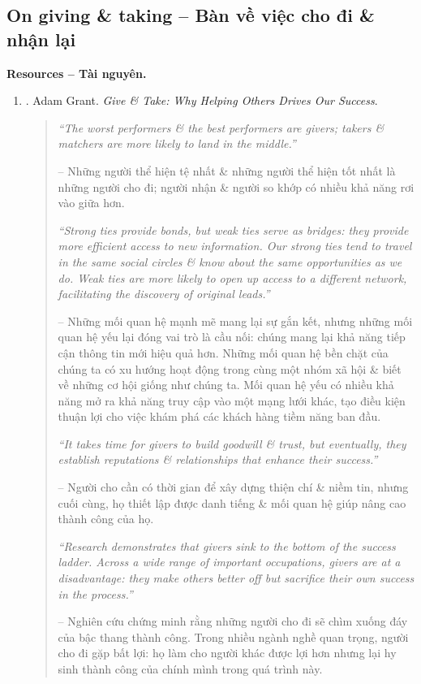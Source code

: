 \documentclass[12pt]{article}
\begin{document}
\subsection{On giving \& taking -- Bàn về việc cho đi \& nhận lại}
\noindent\textbf{\textsf{Resources -- Tài nguyên.}}
\begin{enumerate}
	\item \cite{Grant_give_take}. {\sc Adam Grant}. {\it Give \& Take: Why Helping Others Drives Our Success}.
	\begin{quotation}
		{\it``The worst performers \& the best performers are givers; takers \& matchers are more likely to land in the middle.''}
		
		-- Những người thể hiện tệ nhất \& những người thể hiện tốt nhất là những người cho đi; người nhận \& người so khớp có nhiều khả năng rơi vào giữa hơn.
		
		{\it``Strong ties provide bonds, but weak ties serve as bridges: they provide more efficient access to new information. Our strong ties tend to travel in the same social circles \& know about the same opportunities as we do. Weak ties are more likely to open up access to a different network, facilitating the discovery of original leads.''}
		
		-- Những mối quan hệ mạnh mẽ mang lại sự gắn kết, nhưng những mối quan hệ yếu lại đóng vai trò là cầu nối: chúng mang lại khả năng tiếp cận thông tin mới hiệu quả hơn. Những mối quan hệ bền chặt của chúng ta có xu hướng hoạt động trong cùng một nhóm xã hội \& biết về những cơ hội giống như chúng ta. Mối quan hệ yếu có nhiều khả năng mở ra khả năng truy cập vào một mạng lưới khác, tạo điều kiện thuận lợi cho việc khám phá các khách hàng tiềm năng ban đầu.
		
		{\it``It takes time for givers to build goodwill \& trust, but eventually, they establish reputations \& relationships that enhance their success.''}
		
		-- Người cho cần có thời gian để xây dựng thiện chí \& niềm tin, nhưng cuối cùng, họ thiết lập được danh tiếng \& mối quan hệ giúp nâng cao thành công của họ.		
		
		{\it``Research demonstrates that givers sink to the bottom of the success ladder. Across a wide range of important occupations, givers are at a disadvantage: they make others better off but sacrifice their own success in the process.''}
		
		-- Nghiên cứu chứng minh rằng những người cho đi sẽ chìm xuống đáy của bậc thang thành công. Trong nhiều ngành nghề quan trọng, người cho đi gặp bất lợi: họ làm cho người khác được lợi hơn nhưng lại hy sinh thành công của chính mình trong quá trình này.
		

\end{quotation}
\end{enumerate}
\end{document}
